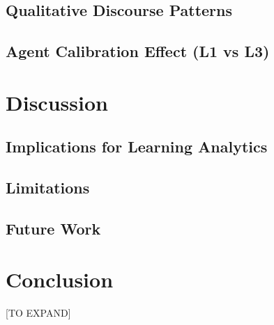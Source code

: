 \documentclass[review,12pt]{elsarticle}
\begin{document}
\subsection{Qualitative Discourse Patterns}

\subsection{Agent Calibration Effect (L1 vs L3)}

\section{Discussion}\label{sec:discussion}

\subsection{Implications for Learning Analytics}
\subsection{Limitations}
\subsection{Future Work}

\section{Conclusion}\label{sec:conclusion}

[TO EXPAND]



\end{document}
